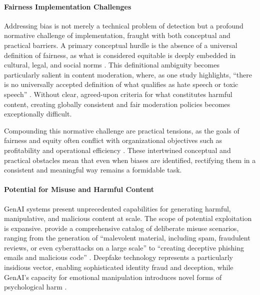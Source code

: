 \paragraph{Fairness Implementation Challenges}
Addressing bias is not merely a technical problem of detection but a profound normative challenge of implementation, fraught with both conceptual and practical barriers. A primary conceptual hurdle is the absence of a universal definition of fairness, as what is considered equitable is deeply embedded in cultural, legal, and social norms \parencite{R01}. This definitional ambiguity becomes particularly salient in content moderation, where, as one study highlights, \enquote{there is no universally accepted definition of what qualifies as hate speech or toxic speech} \parencite{S09}. Without clear, agreed-upon criteria for what constitutes harmful content, creating globally consistent and fair moderation policies becomes exceptionally difficult.

Compounding this normative challenge are practical tensions, as the goals of fairness and equity often conflict with organizational objectives such as profitability and operational efficiency \parencite{R01, R08}. These intertwined conceptual and practical obstacles mean that even when biases are identified, rectifying them in a consistent and meaningful way remains a formidable task.

\paragraph{Potential for Misuse and Harmful Content}
GenAI systems present unprecedented capabilities for generating harmful, manipulative, and malicious content at scale. The scope of potential exploitation is expansive. \citeauthor{S09} provide a comprehensive catalog of deliberate misuse scenarios, ranging from the generation of \enquote{malevolent material, including spam, fraudulent reviews, or even cyberattacks on a large scale} to \enquote{creating deceptive phishing emails and malicious code} \parencite*{S09}. Deepfake technology represents a particularly insidious vector, enabling sophisticated identity fraud and deception, while GenAI's capacity for emotional manipulation introduces novel forms of psychological harm \parencite{R10}.

